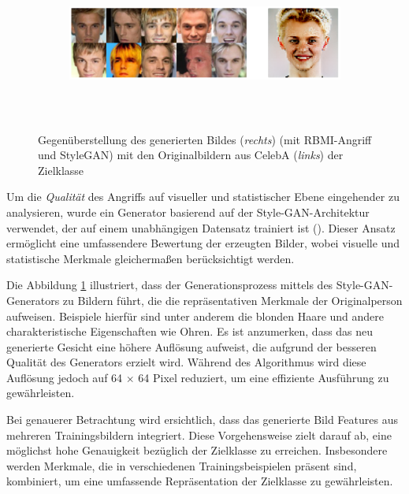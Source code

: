 \begin{figure}[H]
	\centering
	\begin{subfigure}[b]{0.8\linewidth}
		\includegraphics[width=\linewidth, height=5cm, keepaspectratio]{Bilder/0_celeba_rbmi_stylegan.png}
	\end{subfigure}
	\caption{Gegenüberstellung des generierten Bildes (\textit{rechts}) (mit \glqq RBMI\grqq-Angriff und StyleGAN) mit den Originalbildern aus CelebA (\textit{links}) der Zielklasse}
	\label{img:rbmi_visual_stylegan}
\end{figure}

Um die \textit{Qualität} des Angriffs auf visueller und statistischer Ebene eingehender zu analysieren, wurde ein Generator basierend auf der Style-GAN-Architektur verwendet, der auf einem unabhängigen Datensatz trainiert ist (\cite{noauthor_nvlabsffhq-dataset_2023}). Dieser Ansatz ermöglicht eine umfassendere Bewertung der erzeugten Bilder, wobei visuelle und statistische Merkmale gleichermaßen berücksichtigt werden.

Die Abbildung \ref{img:rbmi_visual_stylegan} illustriert, dass der Generationsprozess mittels des Style-GAN-Generators zu Bildern führt, die die repräsentativen Merkmale der Originalperson aufweisen. Beispiele hierfür sind unter anderem die blonden Haare und andere charakteristische Eigenschaften wie Ohren. Es ist anzumerken, dass das neu generierte Gesicht eine höhere Auflösung aufweist, die aufgrund der besseren Qualität des Generators erzielt wird. Während des Algorithmus wird diese Auflösung jedoch auf 64 $\times$ 64 Pixel reduziert, um eine effiziente Ausführung zu gewährleisten.

Bei genauerer Betrachtung wird ersichtlich, dass das generierte Bild Features aus mehreren Trainingsbildern integriert. Diese Vorgehensweise zielt darauf ab, eine möglichst hohe Genauigkeit bezüglich der Zielklasse zu erreichen. Insbesondere werden Merkmale, die in verschiedenen Trainingsbeispielen präsent sind, kombiniert, um eine umfassende Repräsentation der Zielklasse zu gewährleisten.

